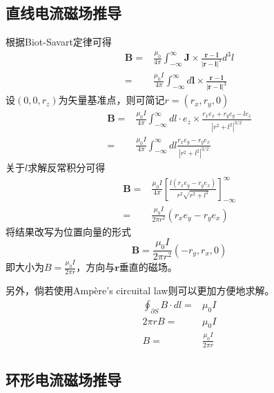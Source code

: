 \subsection{直线电流磁场推导}

根据Biot-Savart定律可得
\begin{align*}
    \mathbf{B}=&\frac{\mu_0}{4\pi}\int_{-\infty}^{\infty}\mathbf{J}\times\frac{\mathbf{r}-\mathbf{l}}{|\mathbf{r}-\mathbf{l}|^3}d^3l\\
    =&\frac{\mu_0I}{4\pi}\int_{-\infty}^{\infty}d\mathbf{l}\times\frac{\mathbf{r}-\mathbf{l}}{|\mathbf{r}-\mathbf{l}|^3}
\end{align*}
设$(0,0,r_z)$为矢量基准点，则可简记$r=(r_x,r_y,0)$
\begin{align*}
    \mathbf{B}=&\frac{\mu_0I}{4\pi}\int_{-\infty}^{\infty}dl\cdot e_z\times\frac{r_xe_x+r_ye_y-le_z}{|r^2+l^2|^{3/2}}\\
    =&\frac{\mu_0I}{4\pi}\int_{-\infty}^{\infty}dl\frac{r_xe_y-r_ye_x}{|r^2+l^2|^{3/2}}
\end{align*}
关于$l$求解反常积分可得
\begin{align*}
    \mathbf{B}=&\frac{\mu_0I}{4\pi}\left[\frac{l(r_xe_y-r_ye_x)}{r^2\sqrt{r^2+l^2}}\right]_{-\infty}^{\infty}\\
    =&\frac{\mu_0I}{2\pi r^2}(r_xe_y-r_ye_x)
\end{align*}
将结果改写为位置向量的形式
\begin{equation*}
    \mathbf{B}=\frac{\mu_0I}{2\pi r^2}(-r_y,r_x,0)
\end{equation*}
即大小为$B=\frac{\mu_0I}{2\pi r}$，方向与$\mathbf{r}$垂直的磁场。

另外，倘若使用Ampère's circuital law则可以更加方便地求解。
\begin{align*}
    \oint_{\partial S}B\cdot dl=&\mu_0I\\
    2\pi r B=&\mu_0I\\
    B=&\frac{\mu_0I}{2\pi r}
\end{align*}

\subsection{环形电流磁场推导}

